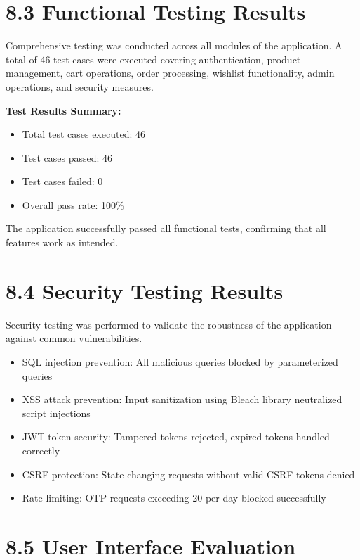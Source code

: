 \documentclass[12pt,a4paper]{report}
\begin{document}
\section*{8.3 Functional Testing Results}

Comprehensive testing was conducted across all modules of the application. A total of 46 test cases were executed covering authentication, product management, cart operations, order processing, wishlist functionality, admin operations, and security measures.

\textbf{Test Results Summary:}
\begin{itemize}
    \item Total test cases executed: 46
    \item Test cases passed: 46
    \item Test cases failed: 0
    \item Overall pass rate: 100\%
\end{itemize}

The application successfully passed all functional tests, confirming that all features work as intended.

\section*{8.4 Security Testing Results}

Security testing was performed to validate the robustness of the application against common vulnerabilities.

\begin{itemize}
    \item SQL injection prevention: All malicious queries blocked by parameterized queries
    \item XSS attack prevention: Input sanitization using Bleach library neutralized script injections
    \item JWT token security: Tampered tokens rejected, expired tokens handled correctly
    \item CSRF protection: State-changing requests without valid CSRF tokens denied
    \item Rate limiting: OTP requests exceeding 20 per day blocked successfully
\end{itemize}

\section*{8.5 User Interface Evaluation}
\end{document}
